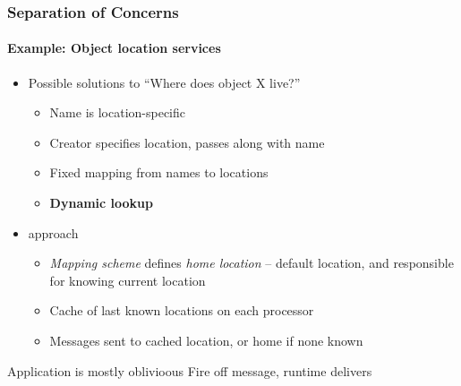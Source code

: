\begin{frame}
\frametitle{Separation of Concerns}
\framesubtitle{Example: Object location services}
\begin{itemize}[<+->]
\item Possible solutions to ``Where does object X live?''
\begin{itemize}[<+->]
\item Name is location-specific
\item Creator specifies location, passes along with name
\item Fixed mapping from names to locations
\item \textbf{Dynamic lookup}
\end{itemize}
\item \charm approach
\begin{itemize}
\item \emph{Mapping scheme} defines \emph{home location} -- default location, and responsible for knowing current location
\item Cache of last known locations on each processor
\item Messages sent to cached location, or home if none known
\end{itemize}
\end{itemize}
\pause
\begin{block}{Application is mostly oblivioous}
Fire off message, runtime delivers
\end{block}
\end{frame}
